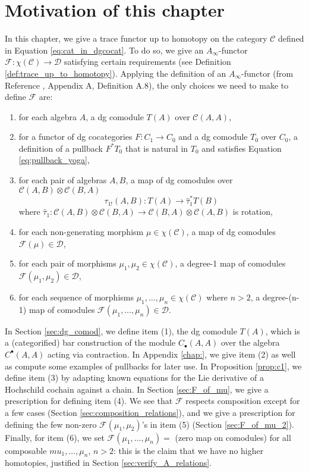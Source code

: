 \section{Motivation of this chapter}
In this chapter, we give a trace functor 
up to homotopy on the category $\mathcal{C}$ 
defined in Equation \ref{eq:cat_in_dgcocat}. 
To do so, we give an $A_\infty$-functor 
$\mathcal{F}: \chi(\mathcal{C}) \to 
\mathcal{D}$ satisfying 
certain requirements (see Definition 
\ref{def:trace_up_to_homotopy}). Applying 
the definition of an $A_\infty$-functor 
(from Reference \cite{F}, 
Appendix A, Definition A.8), the 
only choices we need to make to define 
$\mathcal{F}$ are:
\begin{enumerate}
	\item for each algebra $A$, 
	a dg comodule $T(A)$ over 
	$\mathcal{C}(A, A)$, 
	\item for a functor of dg cocategories 
	$F: C_1 \to C_0$ and a dg comodule $T_0$ over 
	$C_0$, a definition of a pullback 
	$F^*T_0$ that is natural in $T_0$ and satisfies 
	Equation \ref{eq:pullback_yoga},
	\item for each pair of algebras $A,B$, 
	a map of dg comodules over 
	$\mathcal{C}(A,B) \otimes \mathcal{C}(B,A)$
	$$\tau_{1!}(A,B):T(A) \to \hat{\tau}_1^* T(B)$$
	where $\hat{\tau}_1: \mathcal{C}(A,B) \otimes 
	\mathcal{C}(B,A) \to \mathcal{C}(B,A) \otimes 
	\mathcal{C}(A,B)$ is rotation,
	\item for each non-generating 
	morphism $\mu \in \chi(\mathcal{C})$, 
	a map of dg comodules $\mathcal{F}(\mu) \in 
	\mathcal{D}$,
	\item for each pair of morphisms $\mu_1, \mu_2 
	\in \chi(\mathcal{C})$, 
	a degree-1 map of comodules 
	$\mathcal{F}(\mu_1, \mu_2) \in 
	\mathcal{D}$, 
	\item for each sequence of morphisms 
	$\mu_1, \dots, \mu_n \in \chi(\mathcal{C})$ 
	where $n>2$, a degree-(n-1) map of comodules 
	$\mathcal{F}(\mu_1, \dots, \mu_n) \in 
	\mathcal{D}$.
\end{enumerate}
In Section \ref{sec:dg_comod}, we define item (1), the dg 
comodule $T(A)$, which is a (categorified) bar 
construction of the module $C_{\bullet}(A,A)$ over 
the algebra $C^\bullet(A,A)$ acting via contraction. 
In Appendix \ref{chap:}, we give item (2) as well as 
compute some examples of pullbacks for later use. 
In Proposition \ref{prop:c1}, we define item (3) by 
adapting known equations for the Lie derivative of a 
Hochschild cochain against a chain. 
In Section \ref{sec:F_of_mu}, we give a prescription for 
defining item (4). We see that $\mathcal{F}$ 
respects composition except for a few cases 
(Section \ref{sec:composition_relations}), and 
we give a prescription for 
defining the few non-zero $\mathcal{F}(\mu_1, \mu_2)$'s 
in item (5) (Section \ref{sec:F_of_mu_2}). 
Finally, for item (6), we set 
$\mathcal{F}(\mu_1, \dots, \mu_n) = $ (zero map 
on comodules) for all composable $mu_1, \dots, \mu_n$, 
$n>2$: this is the claim that we have no higher 
homotopies, justified in Section \ref{sec:verify_A_relations}.